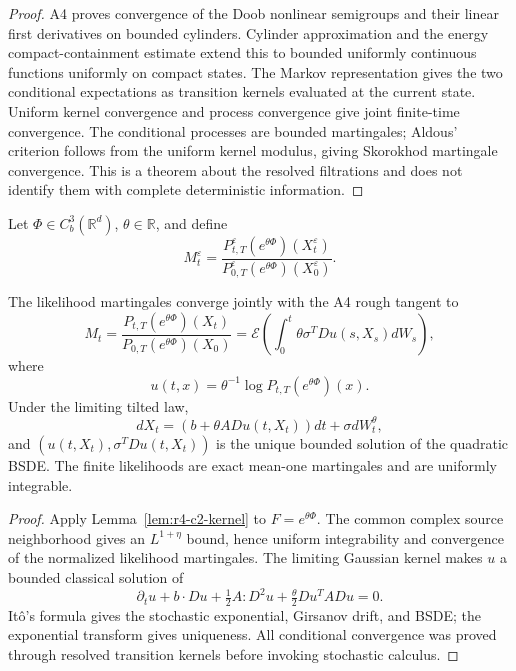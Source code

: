 \begin{proof}
A4 proves convergence of the Doob nonlinear semigroups and their linear first
derivatives on bounded cylinders.  Cylinder approximation and the energy
compact-containment estimate extend this to bounded uniformly continuous
functions uniformly on compact states.  The Markov representation gives the
two conditional expectations as transition kernels evaluated at the current
state.  Uniform kernel convergence and process convergence give joint
finite-time convergence.  The conditional processes are bounded martingales;
Aldous' criterion follows from the uniform kernel modulus, giving Skorokhod
martingale convergence.  This is a theorem about the resolved filtrations and
does not identify them with complete deterministic information.
\end{proof}

Let \(\Phi\in C_b^3(\mathbb R^d)\), \(\theta\in\mathbb R\), and define
\[
 M_t^\varepsilon
 =\frac{P_{t,T}^\varepsilon(e^{\theta\Phi})(X_t^\varepsilon)}
 {P_{0,T}^\varepsilon(e^{\theta\Phi})(X_0^\varepsilon)}.
\]

\begin{theorem}
\label{thm:r3-c2-girsanov}
The likelihood martingales converge jointly with the A4 rough tangent to
\[
 M_t=
 \frac{P_{t,T}(e^{\theta\Phi})(X_t)}
 {P_{0,T}(e^{\theta\Phi})(X_0)}
 =\mathcal E\left(
 \int_0^t\theta\sigma^TDu(s,X_s)dW_s
 \right),
\]
where
\[
 u(t,x)=\theta^{-1}\log P_{t,T}(e^{\theta\Phi})(x).
\]
Under the limiting tilted law,
\[
 dX_t=(b+\theta A Du(t,X_t))dt+\sigma dW_t^\theta,
\]
and \((u(t,X_t),\sigma^TDu(t,X_t))\) is the unique bounded solution of the
quadratic BSDE.  The finite likelihoods are exact mean-one martingales and are
uniformly integrable.
\end{theorem}

\begin{proof}
Apply Lemma~\ref{lem:r4-c2-kernel} to
\(F=e^{\theta\Phi}\).  The common complex source neighborhood gives an
\(L^{1+\eta}\) bound, hence uniform integrability and convergence of the
normalized likelihood martingales.  The limiting Gaussian kernel makes \(u\)
a bounded classical solution of
\[
 \partial_tu+b\cdot Du+\tfrac12A:D^2u+
 \tfrac\theta2Du^TADu=0.
\]
It\^o's formula gives the stochastic exponential, Girsanov drift, and BSDE;
the exponential transform gives uniqueness.  All conditional convergence was
proved through resolved transition kernels before invoking stochastic
calculus.
\end{proof}

